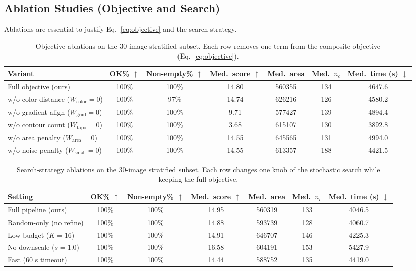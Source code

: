 \documentclass[journal]{IEEEtran}
\begin{document}
\subsection{Ablation Studies (Objective and Search)}
\label{sec:ablations}
Ablations are essential to justify Eq.~\eqref{eq:objective} and the search strategy.

\begin{table}[t]
\centering
\caption{Objective ablations on the 30-image stratified subset. Each row removes one term from the composite objective (Eq.~\ref{eq:objective}).}
\label{tab:abl_obj}
\begin{tabular}{lcccccc}
\toprule
Variant & OK\% $\uparrow$ & Non-empty\% $\uparrow$ & Med.\ score $\uparrow$ & Med.\ area & Med.\ $n_c$ & Med.\ time (s) $\downarrow$ \\
\midrule
Full objective (ours) & 100\% & 100\% & 14.80 & 560355 & 134 & 4647.6 \\
w/o color distance ($W_{\mathrm{color}}{=}0$) & 100\% & 97\% & 14.74 & 626216 & 126 & 4580.2 \\
w/o gradient align ($W_{\mathrm{grad}}{=}0$) & 100\% & 100\% & 9.71 & 577427 & 139 & 4894.4 \\
w/o contour count ($W_{\text{topo}}{=}0$) & 100\% & 100\% & 3.68 & 615107 & 130 & 3892.8 \\
w/o area penalty ($W_{\text{area}}{=}0$) & 100\% & 100\% & 14.55 & 645565 & 131 & 4994.0 \\
w/o noise penalty ($W_{\text{small}}{=}0$) & 100\% & 100\% & 14.55 & 613357 & 188 & 4421.5 \\
\bottomrule
\end{tabular}
\end{table}

\begin{table}[t]
\centering
\caption{Search-strategy ablations on the 30-image stratified subset. Each row changes one knob of the stochastic search while keeping the full objective.}
\label{tab:abl_search}
\begin{tabular}{lcccccc}
\toprule
Setting & OK\% $\uparrow$ & Non-empty\% $\uparrow$ & Med.\ score $\uparrow$ & Med.\ area & Med.\ $n_c$ & Med.\ time (s) $\downarrow$ \\
\midrule
Full pipeline (ours) & 100\% & 100\% & 14.95 & 560319 & 133 & 4046.5 \\
Random-only (no refine) & 100\% & 100\% & 14.88 & 593739 & 128 & 4060.7 \\
Low budget ($K{=}16$) & 100\% & 100\% & 14.91 & 646707 & 146 & 4225.3 \\
No downscale ($s{=}1.0$) & 100\% & 100\% & 16.58 & 604191 & 153 & 5427.9 \\
Fast (60 s timeout) & 100\% & 100\% & 14.44 & 588752 & 135 & 4419.0 \\
\bottomrule
\end{tabular}
\end{table}
\end{document}
